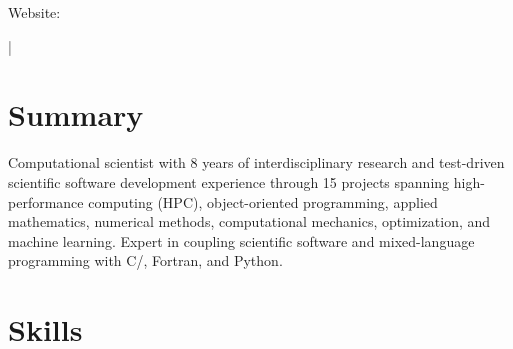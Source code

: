 \documentclass[letterpaper,10pt]{article}
\begin{document}
{\scshape\huge\Author}\vspace{2pt}

\begin{small}
  Website: \href{\AuthorWebsiteLink}{\AuthorWebsiteText}

  \vspace{2pt}\AuthorAddress

  \vspace{1pt}\href{mailto:\AuthorEmail}{\AuthorEmail} |
  \href{\AuthorPhoneLink}{\AuthorPhoneText}
\end{small}

\section{Summary}
Computational scientist with 8 years of interdisciplinary research and
test-driven scientific software development experience through 15\smallplus{}
projects spanning high-performance computing (HPC), object-oriented programming,
applied mathematics, numerical methods, computational mechanics, optimization,
and machine learning. Expert in coupling scientific software and mixed-language
programming with C/\CC{}, Fortran, and Python.

\section{Skills}
  \resumeSubItemListStart
  \resumeSubItemListEnd
\end{document}
